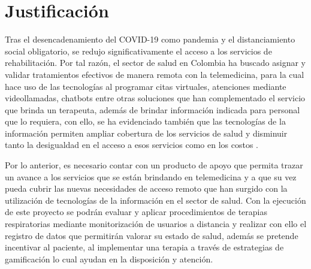 \documentclass[12pt]{article}
\begin{document}
\newpage






\section{Justificación}

Tras el desencadenamiento del COVID-19 como pandemia y el distanciamiento social obligatorio, se redujo significativamente el acceso a los servicios de rehabilitaci\'on. Por tal raz\'on, el sector de salud en Colombia ha buscado asignar y validar tratamientos efectivos de manera remota con la telemedicina, para la cual hace uso de las tecnolog\'ias al programar citas virtuales, atenciones mediante videollamadas, chatbots entre otras soluciones que han complementado el servicio que brinda un terapeuta, adem\'as de brindar informaci\'on indicada para personal que lo requiera, con ello, se  ha evidenciado tambi\'en que las tecnolog\'ias de la informaci\'on permiten ampliar cobertura de los servicios de salud y disminuir tanto la desigualdad en el acceso a esos servicios como en los costos \cite{7}.

Por lo anterior, es necesario contar con un producto de apoyo que permita trazar un avance a los servicios que se est\'an brindando en telemedicina y a que su vez pueda cubrir las nuevas necesidades de acceso remoto que han surgido con la utilizaci\'on de tecnolog\'ias de la informaci\'on en el sector de salud. Con la ejecuci\'on de este proyecto se podr\'an evaluar y aplicar procedimientos de terapias respiratorias mediante monitorizaci\'on de usuarios a distancia y realizar con ello el registro de datos que permitir\'an valorar su estado de salud, adem\'as se pretende incentivar al paciente, al  implementar una terapia a trav\'es de estrategias de gamificaci\'on lo cual ayudan en la disposici\'on y atenci\'on. 

\newpage




\end{document}

